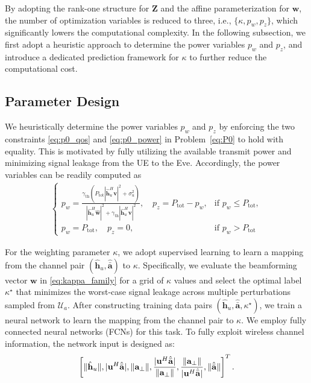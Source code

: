 \documentclass[journal]{IEEEtran}
\begin{document}
By adopting the rank-one structure for $\mathbf{Z}$ and the affine parameterization for $\mathbf{w}$, the number of optimization variables is reduced to three, i.e., $\{\kappa,p_w,p_z\}$, which significantly lowers the computational complexity. In the following subsection, we first adopt a heuristic approach to determine the power variables $p_w$ and $p_z$, and introduce a dedicated prediction framework for $\kappa$ to further reduce the computational cost.

\subsection{Parameter Design}
We heuristically determine the power variables $p_w$ and $p_z$ by enforcing the two constraints \eqref{eq:p0_qos} and \eqref{eq:p0_power} in Problem~\eqref{eq:P0} to hold with equality. This is motivated by fully utilizing the available transmit power and minimizing signal leakage from the UE to the Eve. Accordingly, the power variables can be readily computed as
\begin{align}
\left\{
\begin{array}{ll}
p_w =\displaystyle\frac{\gamma_{\mathrm{th}}(P_{\mathrm{tot}}|\hat{\mathbf{h}}_u^H\mathbf{v}|^2+\sigma_u^2)}{|\hat{\mathbf{h}}_u^H\hat{\mathbf{w}}|^2+\gamma_{\mathrm{th}}|\hat{\mathbf{h}}_u^H\mathbf{v}|^2},\quad
p_z = P_{\mathrm{tot}}-p_w,
& \text{if } p_w \le P_{\mathrm{tot}}, \\[4pt]
p_w = P_{\mathrm{tot}},\quad  p_z = 0,
& \text{if } p_w > P_{\mathrm{tot}}
\end{array}\right.
\label{eq:power_repair}
\end{align}

For the weighting parameter $\kappa$, we adopt supervised learning to learn a mapping from the channel pair $(\hat{\mathbf{h}}_u,\hat{\bar{\mathbf{a}}})$ to $\kappa$. Specifically, we evaluate the beamforming vector $\mathbf{w}$ in \eqref{eq:kappa_family} for a grid of $\kappa$ values and select the optimal label $\kappa^\star$ that minimizes the worst-case signal leakage across multiple perturbations sampled from $\mathcal{U}_a$. After constructing training data pairs $(\hat{\mathbf{h}}_u,\hat{\bar{\mathbf{a}}}, \kappa^\star)$, we train a neural network to learn the mapping from the channel pair to $\kappa$. We employ fully connected neural networks (FCNs) for this task. To fully exploit wireless channel information, the network input is designed as:
\begin{equation}
\left[\|\hat{\mathbf{h}}_u\|, |\mathbf{u}^H\hat{\bar{\mathbf{a}}}|, \|\mathbf{a}_\perp\|, \frac{|\mathbf{u}^H\hat{\bar{\mathbf{a}}}|}{\|\mathbf{a}_\perp\|}, \frac{\|\mathbf{a}_\perp\|}{|\mathbf{u}^H\hat{\bar{\mathbf{a}}}|}, \|\hat{\bar{\mathbf{a}}}\|\right]^T.
\notag
\end{equation}
\end{document}
